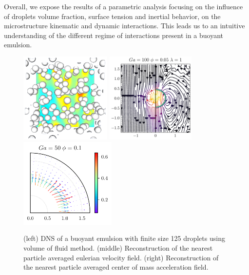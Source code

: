 \documentclass{icnmmf5}
\begin{document}
Overall, we expose the results of a parametric analysis focusing on the influence of droplets volume fraction, surface tension and inertial behavior, on the microstructure kinematic and dynamic interactions.
This leads us to an intuitive understanding of the different regime of interactions present in a buoyant emulsion. 
\begin{figure}[b]
  \begin{center}
   \includegraphics[height=4.5cm]{image/3D/P_PHI_5.png}
   \includegraphics[height=4.5cm]{image/HOMOGENEOUS/Stream/Stream_PHI_5_Ga_100_l_1.pdf}
   \includegraphics[height=4.5cm]{image/HOMOGENEOUS/fDrop/F_mu_r_1_0_Ga_50_PHI_0_1.pdf}
  \end{center}
  \caption{(left) DNS of a buoyant emulsion with finite size 125 droplets using volume of fluid method.
  (middle) Reconstruction of the nearest particle averaged eulerian velocity field.
  (right) Reconstruction of the nearest particle averaged center of mass acceleration field.}
  \label{fig:tower}
\end{figure}

\end{document}
